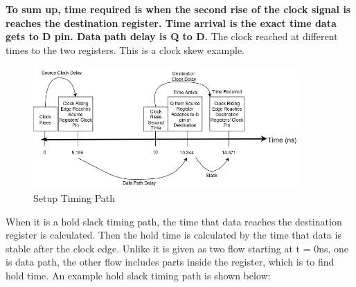 \documentclass{report}
\begin{document}
\textbf{To sum up, time required is when the second rise of the clock signal is reaches the destination register. Time arrival is the exact time data gets to D pin. Data path delay is Q to D.} The clock reached at different times to the two registers. This is a clock skew example.


\begin{figure}[h!]
    \centering
    \includegraphics[width=0.9\textwidth]{images/setup_analys.png}
    \caption{Setup Timing Path}
    \label{fig:setup_timing_path}
\end{figure}

When it is a hold slack timing path, the time that data reaches the destination register is calculated. Then the hold time is calculated by the time that data is stable after the clock edge.
Unlike it is given as two flow starting at t = 0ns, one is data path, the other flow includes parts inside the register, which is to find hold time. 
An example hold slack timing path is shown below:
\end{document}
